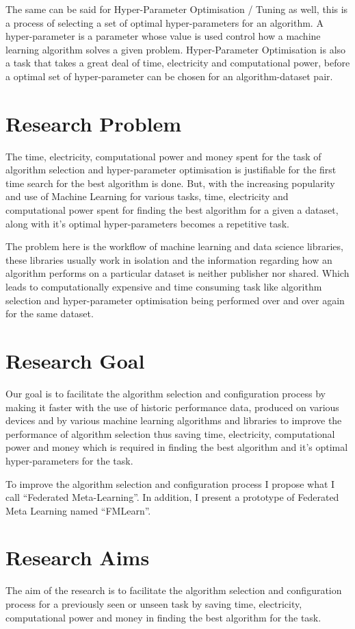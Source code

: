 The same can be said for Hyper-Parameter Optimisation / Tuning as well, this is a process of selecting a set of optimal hyper-parameters for an algorithm. A hyper-parameter is a parameter whose value is used control how a machine learning algorithm solves a given problem. Hyper-Parameter Optimisation is also a task that takes a great deal of time, electricity and computational power, before a optimal set of hyper-parameter can be chosen for an algorithm-dataset pair.

\section{Research Problem}
The time, electricity, computational power and money spent for the task of algorithm selection and hyper-parameter optimisation is justifiable for the first time search for the best algorithm is done. But, with the increasing popularity and use of Machine Learning for various tasks, time, electricity and computational power spent for finding the best algorithm for a given a dataset, along with it's optimal hyper-parameters becomes a repetitive task.

The problem here is the workflow of machine learning and data science libraries, these libraries usually work in isolation and the information regarding how an algorithm performs on a particular dataset is neither publisher nor shared. Which leads to computationally expensive and time consuming task like algorithm selection and hyper-parameter optimisation being performed over and over again for the same dataset.

\section{Research Goal}
Our goal is to facilitate the algorithm selection and configuration process by making it faster with the use of historic performance data, produced on various devices and by various machine learning algorithms and libraries to improve the performance of algorithm selection thus saving time, electricity, computational power and money which is required in finding the best algorithm and it's optimal hyper-parameters for the task.

To improve the algorithm selection and configuration process I propose what I call “Federated Meta-Learning”. In addition, I present a prototype of Federated Meta Learning named “FMLearn”.

\section{Research Aims}
The aim of the research is to facilitate the algorithm selection and configuration process for a previously seen or unseen task by saving time, electricity, computational power and money in finding the best algorithm for the task. 

